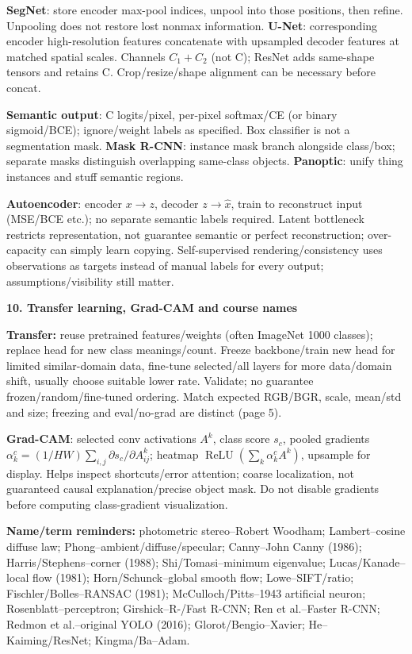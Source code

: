 \documentclass[a4paper]{article}
\newcommand{\key}[1]{\textbf{#1}}
\newcommand{\Topic}[1]{\par\vspace{1.7pt}\noindent
  {\fontsize{7.7}{8.0}\selectfont\bfseries #1}\par\vspace{0.3pt}}
\newcommand{\relu}{\operatorname{ReLU}}
\newcounter{sheet}
\newcounter{sheetcolumn}
\newlength{\colwidth}
\newenvironment{sheetcol}[1][7.0]{\stepcounter{sheetcolumn}
  \begin{lrbox}{\columnbox}\begin{minipage}[t]{\colwidth}\vspace{0pt}
  \fontsize{#1}{\dimexpr#1pt+0.6pt\relax}\selectfont}
  {\end{minipage}\end{lrbox}
  \typeout{CV1COL|\thesheet|\thesheetcolumn|\the\dimexpr\ht\columnbox+\dp\columnbox\relax}
  \usebox{\columnbox}\ignorespacesafterend}
\begin{document}
\begin{sheetcol}
\key{SegNet}: store encoder max-pool indices, unpool into those positions, then refine. Unpooling does not restore lost nonmax information. \key{U-Net}: corresponding encoder high-resolution features concatenate with upsampled decoder features at matched spatial scales. Channels \(C_1+C_2\) (not C); ResNet adds same-shape tensors and retains C. Crop/resize/shape alignment can be necessary before concat.

\key{Semantic output}: C logits/pixel, per-pixel softmax/CE (or binary sigmoid/BCE); ignore/weight labels as specified. Box classifier is not a segmentation mask. \key{Mask R-CNN}: instance mask branch alongside class/box; separate masks distinguish overlapping same-class objects. \key{Panoptic}: unify thing instances and stuff semantic regions.

\key{Autoencoder}: encoder \(x\to z\), decoder \(z\to\hat x\), train to reconstruct input (MSE/BCE etc.); no separate semantic labels required. Latent bottleneck restricts representation, not guarantee semantic or perfect reconstruction; over-capacity can simply learn copying. Self-supervised rendering/consistency uses observations as targets instead of manual labels for every output; assumptions/visibility still matter.

\Topic{10. Transfer learning, Grad-CAM and course names}
\key{Transfer:} reuse pretrained features/weights (often ImageNet 1000 classes); replace head for new class meanings/count. Freeze backbone/train new head for limited similar-domain data, fine-tune selected/all layers for more data/domain shift, usually choose suitable lower rate. Validate; no guarantee frozen/random/fine-tuned ordering. Match expected RGB/BGR, scale, mean/std and size; freezing and eval/no-grad are distinct (page 5).

\key{Grad-CAM}: selected conv activations \(A^k\), class score \(s_c\), pooled gradients \(\alpha_k^c=(1/HW)\sum_{i,j}\partial s_c/\partial A^k_{ij}\); heatmap \(\relu(\sum_k\alpha_k^c A^k)\), upsample for display. Helps inspect shortcuts/error attention; coarse localization, not guaranteed causal explanation/precise object mask. Do not disable gradients before computing class-gradient visualization.

\key{Name/term reminders:} photometric stereo--Robert Woodham; Lambert--cosine diffuse law; Phong--ambient/diffuse/specular; Canny--John Canny (1986); Harris/Stephens--corner (1988); Shi/Tomasi--minimum eigenvalue; Lucas/Kanade--local flow (1981); Horn/Schunck--global smooth flow; Lowe--SIFT/ratio; Fischler/Bolles--RANSAC (1981); McCulloch/Pitts--1943 artificial neuron; Rosenblatt--perceptron; Girshick--R-/Fast R-CNN; Ren et al.--Faster R-CNN; Redmon et al.--original YOLO (2016); Glorot/Bengio--Xavier; He--Kaiming/ResNet; Kingma/Ba--Adam.


\end{sheetcol}
\end{document}
